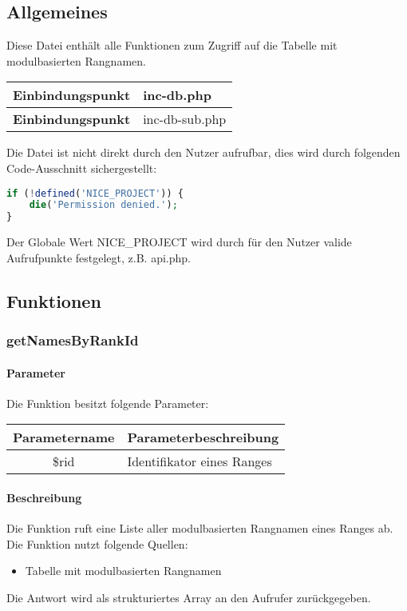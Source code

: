\subsection{Allgemeines} Diese Datei enthält alle Funktionen zum Zugriff auf die Tabelle mit modulbasierten Rangnamen.
\begin{table}[H]
	\begin{tabular}{|c|p{11cm}|}
		\hline
		\textbf{Einbindungspunkt} & inc-db.php \\ \hline
		\textbf{Einbindungspunkt} & inc-db-sub.php \\ \hline
	\end{tabular}
\end{table}
Die Datei ist nicht direkt durch den Nutzer aufrufbar, dies wird durch folgenden Code-Ausschnitt sichergestellt:
\begin{lstlisting}[language=php]
if (!defined('NICE_PROJECT')) {
	die('Permission denied.');
}
\end{lstlisting}
Der Globale Wert {\glqq NICE\_PROJECT\grqq} wird durch für den Nutzer valide Aufrufpunkte festgelegt, z.B. {\glqq api.php\grqq}.
\newpage
\subsection{Funktionen}
\subsubsection{getNamesByRankId}
\paragraph{Parameter} Die Funktion besitzt folgende Parameter:
\begin{table}[H]
	\begin{tabular}{|c|p{11cm}|}
		\hline
		\textbf{Parametername} & \textbf{Parameterbeschreibung} \\ \hline
		\$rid & Identifikator eines Ranges \\ \hline
	\end{tabular}
\end{table}
\paragraph{Beschreibung} Die Funktion ruft eine Liste aller modulbasierten Rangnamen eines Ranges ab. Die Funktion nutzt folgende Quellen:
\begin{itemize}
	\item Tabelle mit modulbasierten Rangnamen
\end{itemize}
Die Antwort wird als strukturiertes Array an den Aufrufer zurückgegeben.
